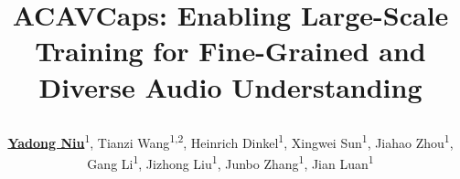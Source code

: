 


\renewcommand{\PosterRowOneHeight}{11.2in}
\graphicspath{{assets/}}
\title{\parbox{\linewidth}{\centering ACAVCaps: Enabling Large-Scale Training for Fine-Grained and Diverse Audio Understanding}}
\author{\underline{\textbf{Yadong Niu}}\textsuperscript{1},
    Tianzi Wang\textsuperscript{1,2},
    Heinrich Dinkel\textsuperscript{1},
    Xingwei Sun\textsuperscript{1},
    Jiahao Zhou\textsuperscript{1},
    Gang Li\textsuperscript{1},
    Jizhong Liu\textsuperscript{1},
    Junbo Zhang\textsuperscript{1},
    Jian Luan\textsuperscript{1}}
\titlegraphicleft{\PosterLeftLogo}
\titlegraphic{\PosterRightLogo}

\newcommand{\PosterRepositoryUrl}{https://github.com/xiaomi-research/acavcaps}
\newcommand{\PosterRepositoryText}{github.com/xiaomi-research/acavcaps}
